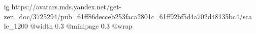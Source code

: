  
 
 
 
 

\ifcmt
  ig https://avatars.mds.yandex.net/get-zen_doc/3725294/pub_61ff86decceb253faca2801c_61ff92bf5d4a702d48135bc4/scale_1200
  @width 0.3
  @minipage 0.3
  @wrap \parpic[r]
\fi
